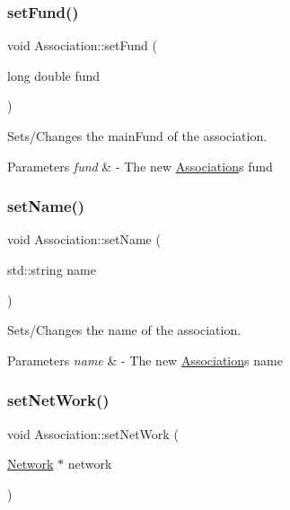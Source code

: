 \subsubsection{\texorpdfstring{set\+Fund()}{setFund()}}
{\footnotesize\ttfamily void Association\+::set\+Fund (\begin{DoxyParamCaption}\item[{long double}]{fund }\end{DoxyParamCaption})}



Sets/\+Changes the main\+Fund of the association. 


\begin{DoxyParams}{Parameters}
{\em fund} & -\/ The new \mbox{\hyperlink{classAssociation}{Association}}\textquotesingle{}s fund \\
\hline
\end{DoxyParams}
\mbox{\label{classAssociation_a8bd23fd6c727963237bf85a6374ab6d8}} 
\subsubsection{\texorpdfstring{set\+Name()}{setName()}}
{\footnotesize\ttfamily void Association\+::set\+Name (\begin{DoxyParamCaption}\item[{std\+::string}]{name }\end{DoxyParamCaption})}



Sets/\+Changes the name of the association. 


\begin{DoxyParams}{Parameters}
{\em name} & -\/ The new \mbox{\hyperlink{classAssociation}{Association}}\textquotesingle{}s name \\
\hline
\end{DoxyParams}
\mbox{\label{classAssociation_afa9bdcebf905cddc52870dd156a14d54}} 
\subsubsection{\texorpdfstring{set\+Net\+Work()}{setNetWork()}}
{\footnotesize\ttfamily void Association\+::set\+Net\+Work (\begin{DoxyParamCaption}\item[{\mbox{\hyperlink{classNetwork}{Network}} $\ast$}]{network }\end{DoxyParamCaption})}


